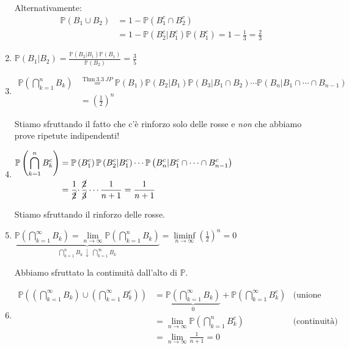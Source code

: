 \begin{enumerate}
Alternativamente:\begin{equation*}
\begin{aligned}
\mathbb{P}( B_{1} \cup B_{2}) & =1-\mathbb{P}\left( B_{1}^{c} \cap B_{2}^{c}\right)\\
 & =1-\mathbb{P}\left( B_{2}^{c} |B_{1}^{c}\right)\mathbb{P}\left( B_{1}^{c}\right) =1-\frac{1}{3} =\frac{2}{3}
\end{aligned}
\end{equation*}
\item $\mathbb{P}( B_{1} |B_{2}) =\frac{\mathbb{P}( B_{2} |B_{1})\mathbb{P}( B_{1})}{\mathbb{P}( B_{2})} =\frac{3}{5}$
\item $\begin{aligned}
\mathbb{P}\left(\bigcap\limits _{k=1}^{n} B_{k}\right) & \overset{\text{Thm} \ 3.3\ JP}{=}\mathbb{P}( B_{1})\mathbb{P}( B_{2} |B_{1})\mathbb{P}( B_{3} |B_{1} \cap B_{2}) \cdots \mathbb{P}( B_{n} |B_{1} \cap \cdots \cap B_{n-1})\\
 & =\left(\frac{1}{2}\right)^{n}
\end{aligned}$

Stiamo sfruttando il fatto che c'è rinforzo solo delle rosse e \textit{non} che abbiamo prove ripetute indipendenti!
\item $\begin{aligned}
\mathbb{P}\left(\bigcap\limits _{k=1}^{n} B_{k}^{c}\right) & =\mathbb{P}\left( B_{1}^{c}\right)\mathbb{P}\left( B_{2}^{c} |B_{1}^{c}\right) \cdots \mathbb{P}\left( B_{n}^{c} |B_{1}^{c} \cap \cdots \cap B_{n-1}^{c}\right)\\
 & =\frac{1}{\cancel{2}} \cdotp \frac{\cancel{2}}{\cancel{3}} \cdots \frac{1}{n+1} =\frac{1}{n+1}
\end{aligned}$

Stiamo sfruttando il rinforzo delle rosse.
\item $\underbrace{\mathbb{P}\left(\bigcap\limits _{k=1}^{\infty } B_{k}\right) =\lim\limits _{n\rightarrow \infty }\mathbb{P}\left(\bigcap\limits _{k=1}^{n} B_{k}\right)}_{\bigcap _{k=1}^{n} B_{k} \ \downarrow \ \bigcap _{k=1}^{\infty } B_{k}} =\liminf\limits _{n\rightarrow \infty }\left(\frac{1}{2}\right)^{n} =0$

Abbiamo sfruttato la continuità dall'alto di $\mathbb{P}$.
\item $\begin{aligned}
\mathbb{P}\left(\left(\bigcap\limits _{k=1}^{\infty } B_{k}\right) \cup \left(\bigcap\limits _{k=1}^{\infty } B_{k}^{c}\right)\right) & =\underbrace{\mathbb{P}\left(\bigcap\limits _{k=1}^{\infty } B_{k}\right)}_{0} +\mathbb{P}\left(\bigcap\limits _{k=1}^{\infty } B_{k}^{c}\right) & \text{(unione disgiunta)}\\
 & =\lim\limits _{n\rightarrow \infty }\mathbb{P}\left(\bigcap\limits _{k=1}^{n} B_{k}^{c}\right) & \text{(continuità)}\\
 & =\lim\limits _{n\rightarrow \infty }\frac{1}{n+1} =0 & 
\end{aligned}$
\end{enumerate}
\subsubsection{}